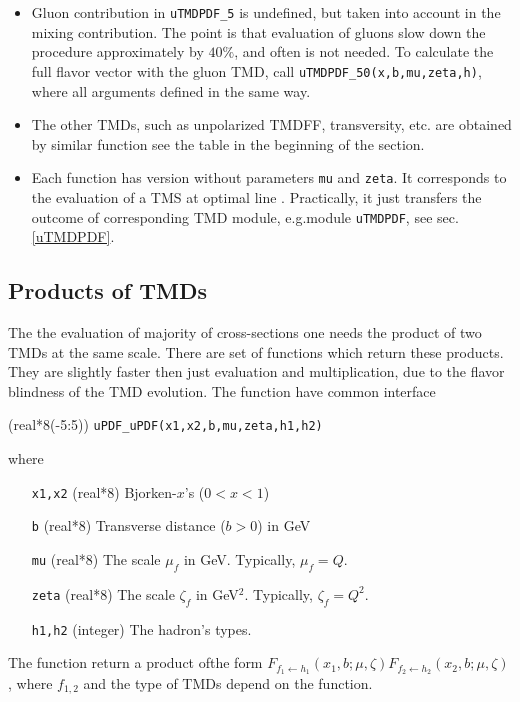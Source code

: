 \documentclass[prd,nofootinbib,eqsecnum,final]{revtex4}
\newcommand{\ot}{\leftarrow}
\renewcommand{\(}{\left(}
\renewcommand{\)}{\right)}
\renewcommand{\[}{\left[}
\renewcommand{\]}{\right]}
\begin{document}
\begin{itemize}
\item Gluon contribution in \texttt{uTMDPDF{\_}5} is undefined, but taken into account in the mixing contribution. The point is that evaluation of gluons slow down the procedure approximately by $40\%$, and often is not needed. To calculate the full flavor vector with the gluon TMD, call \texttt{uTMDPDF{\_}50(x,b,mu,zeta,h)}, where all arguments defined in the same way.

\item The other TMDs, such as unpolarized TMDFF, transversity, etc. are obtained by similar function see the table in the beginning of the section.

\item Each function has version without parameters \texttt{mu} and \texttt{zeta}. It corresponds to the evaluation of a TMS at optimal line \cite{Scimemi:2018xaf}. Practically, it just transfers the outcome of corresponding TMD module, e.g.module \texttt{uTMDPDF}, see sec.\ref{uTMDPDF}.
\end{itemize}

\subsection{Products of TMDs}
\label{TMDs:products}

The the evaluation of majority of cross-sections one needs the product of two TMDs at the same scale. There are set of functions which return these products. They are slightly faster then just evaluation and multiplication, due to the flavor blindness of the TMD evolution. The function have common interface

(real*8(-5:5)) \texttt{uPDF{\_}uPDF(x1,x2,b,mu,zeta,h1,h2)}

where
\begin{itemize}
\item [\texttt{x1,x2}] (real*8) Bjorken-$x$'s ($0<x<1$)
\item [\texttt{b}] (real*8) Transverse distance ($b>0$) in GeV
\item [\texttt{mu}] (real*8) The scale $\mu_f$ in GeV. Typically, $\mu_f=Q$.
\item [\texttt{zeta}] (real*8) The scale $\zeta_f$ in GeV$^2$. Typically, $\zeta_f=Q^2$.
\item [\texttt{h1,h2}] (integer) The hadron's types.
\end{itemize}
The function return a product ofthe form $F_{f_1\ot h_1}(x_1,b;\mu,\zeta)F_{f_2\ot h_2}(x_2,b;\mu,\zeta)$, where $f_{1,2}$ and the type of TMDs depend on the function.
\end{document}
